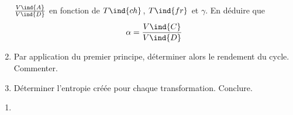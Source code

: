 \documentclass[../../main/main.tex]{subfiles}
\begin{document}
\begin{tcb*}[breakable]
\begin{enumerate}[label=\sqenumi]
      $\frac{V\ind{A}}{V\ind{D}}$ en fonction de $T\ind{ch}$, $T\ind{fr}$ et
      $\gamma$. En déduire que
      \[
        \alpha = \frac{V\ind{C}}{V\ind{D}}
      \]
      \vspace{-15pt}
    \item Par application du premier principe, déterminer alors le rendement du
      cycle. Commenter.
    \item Déterminer l'entropie créée pour chaque transformation. Conclure.
  \end{enumerate}
  \tcblower
  \begin{enumerate}[label=\sqenumi]
    \item ~
      \vspace{-30pt}
      \smallbreak
      \begin{isd}
\end{isd}
\end{enumerate}
\end{tcb*}
\end{document}
